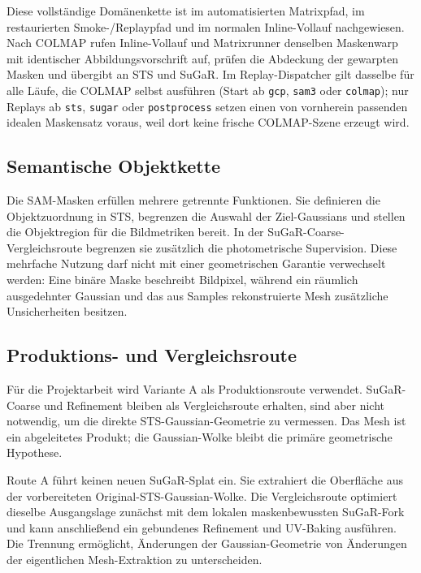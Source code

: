 Diese vollständige Domänenkette ist im automatisierten Matrixpfad, im
restaurierten Smoke-/Replaypfad und im normalen Inline-Vollauf nachgewiesen.
Nach COLMAP rufen Inline-Vollauf und Matrixrunner denselben Maskenwarp mit
identischer Abbildungsvorschrift auf, prüfen die Abdeckung der gewarpten
Masken und übergibt  an STS und SuGaR. Im
Replay-Dispatcher gilt dasselbe für alle Läufe, die COLMAP selbst ausführen
(Start ab \texttt{gcp}, \texttt{sam3} oder \texttt{colmap}); nur Replays ab
\texttt{sts}, \texttt{sugar} oder \texttt{postprocess} setzen einen von
vornherein passenden idealen Maskensatz voraus, weil dort keine frische
COLMAP-Szene erzeugt wird.

\subsection{Semantische Objektkette}

Die SAM-Masken erfüllen mehrere getrennte Funktionen. Sie definieren die
Objektzuordnung in STS, begrenzen die Auswahl der Ziel-Gaussians und stellen die
Objektregion für die Bildmetriken bereit. In der SuGaR-Coarse-Vergleichsroute
begrenzen sie zusätzlich die photometrische Supervision. Diese mehrfache
Nutzung darf nicht mit einer geometrischen Garantie verwechselt werden: Eine
binäre Maske beschreibt Bildpixel, während ein räumlich ausgedehnter Gaussian
und das aus Samples rekonstruierte Mesh zusätzliche Unsicherheiten besitzen.

\subsection{Produktions- und Vergleichsroute}

Für die Projektarbeit wird Variante A als Produktionsroute verwendet. SuGaR-
Coarse und Refinement bleiben als Vergleichsroute erhalten, sind aber nicht
notwendig, um die direkte STS-Gaussian-Geometrie zu vermessen. Das Mesh ist ein
abgeleitetes Produkt; die Gaussian-Wolke bleibt die primäre geometrische
Hypothese.

Route A führt keinen neuen SuGaR-Splat ein. Sie extrahiert die Oberfläche aus
der vorbereiteten Original-STS-Gaussian-Wolke. Die Vergleichsroute optimiert
dieselbe Ausgangslage zunächst mit dem lokalen maskenbewussten SuGaR-Fork und
kann anschließend ein gebundenes Refinement und UV-Baking ausführen. Die
Trennung ermöglicht, Änderungen der Gaussian-Geometrie von Änderungen der
eigentlichen Mesh-Extraktion zu unterscheiden.

